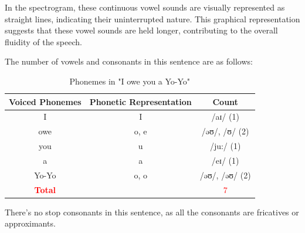 In the spectrogram, these continuous vowel sounds are visually represented as straight lines, indicating their uninterrupted nature. This graphical representation suggests that these vowel sounds are held longer, contributing to the overall fluidity of the speech.

The number of vowels and consonants in this sentence are as follows:

\begin{table}[H]
    \centering
    \begin{tabular}{|c|c|c|}
        \hline
        \textbf{Voiced Phonemes} & \textbf{Phonetic Representation} & \textbf{Count} \\ \hline
        I  & I & /aɪ/ (1) \\ \hline
        owe & o, e & /əʊ/, /ʊ/ (2) \\ \hline
        you & u & /ju:/ (1) \\ \hline
        a & a & /eɪ/ (1) \\ \hline
        Yo-Yo & o, o & /əʊ/, /əʊ/ (2) \\ \hline
        \textcolor{red}{\textbf{Total}} & & \textcolor{red}{7} \\ \hline
    \end{tabular}
    \caption{Phonemes in "I owe you a Yo-Yo"}
\end{table}

There's no stop consonants in this sentence, as all the consonants are fricatives or approximants.

\newpage